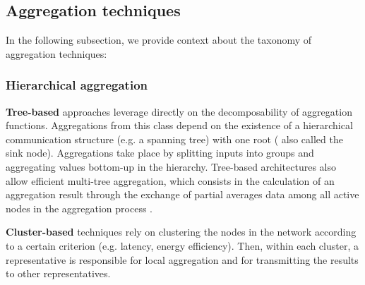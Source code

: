 

\subsection{Aggregation techniques}

In the following subsection, we provide context about the taxonomy of aggregation techniques:

\subsubsection*{Hierarchical aggregation}

\textbf{Tree-based} approaches leverage directly on the decomposability of aggregation functions. Aggregations from this class depend on the existence of a hierarchical communication structure (e.g. a spanning tree) with one root ( also called the sink node). Aggregations take place by splitting inputs into groups and aggregating values bottom-up in the hierarchy.  Tree-based architectures also allow efficient multi-tree aggregation, which consists in the calculation of an aggregation result through the exchange of partial averages data among all active nodes in the aggregation process \cite{akosThesis}. 


\textbf{Cluster-based} techniques rely on clustering the nodes in the network according to a certain criterion (e.g. latency, energy efficiency). Then, within each cluster, a representative is responsible for local aggregation and for transmitting the results to other representatives. 

